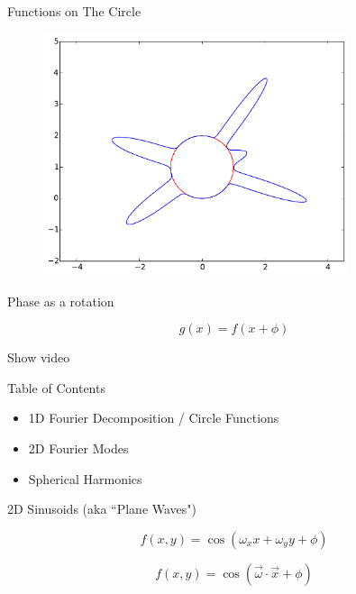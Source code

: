 \documentclass{beamer}
\begin{document}
\begin{frame}{Functions on The Circle}

\begin{figure}
    \includegraphics[width=0.8\textwidth]{5GaussiansCircleWrap.pdf}
\end{figure}


\end{frame}

\begin{frame}

Phase as a rotation

\[ g(x) = f(x + \phi) \]

Show video

\end{frame}


\begin{frame}{Table of Contents}
\begin{itemize}[label=$\vartriangleright$]
	\item 1D Fourier Decomposition / Circle Functions
\end{itemize}
\begin{itemize}[label=$\blacktriangleright$]
	\item 2D Fourier Modes
\end{itemize}
\begin{itemize}[label=$\vartriangleright$]
	\item Spherical Harmonics
\end{itemize}
\end{frame}


\begin{frame}{2D Sinusoids (aka ``Plane Waves")}

\[ f(x, y) = \cos( \omega_x x + \omega_y y + \phi) \]

\[ f(x, y) = \cos( \vec{\omega} \cdot \vec{x} + \phi ) \]

\end{frame}
\end{document}
